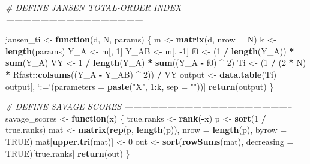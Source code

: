 \documentclass[11pt,]{article}
\newenvironment{Shaded}{\begin{snugshade}}{\end{snugshade}}
\newcommand{\CommentTok}[1]{\textcolor[rgb]{0.56,0.35,0.01}{\textit{#1}}}
\newcommand{\ControlFlowTok}[1]{\textcolor[rgb]{0.13,0.29,0.53}{\textbf{#1}}}
\newcommand{\DataTypeTok}[1]{\textcolor[rgb]{0.13,0.29,0.53}{#1}}
\newcommand{\DecValTok}[1]{\textcolor[rgb]{0.00,0.00,0.81}{#1}}
\newcommand{\KeywordTok}[1]{\textcolor[rgb]{0.13,0.29,0.53}{\textbf{#1}}}
\newcommand{\NormalTok}[1]{#1}
\newcommand{\OperatorTok}[1]{\textcolor[rgb]{0.81,0.36,0.00}{\textbf{#1}}}
\newcommand{\OtherTok}[1]{\textcolor[rgb]{0.56,0.35,0.01}{#1}}
\newcommand{\StringTok}[1]{\textcolor[rgb]{0.31,0.60,0.02}{#1}}
\begin{document}
\begin{Shaded}
\begin{Highlighting}[]
\CommentTok{# DEFINE JANSEN TOTAL-ORDER INDEX ------------------------------------------------}

\NormalTok{jansen_ti <-}\StringTok{ }\ControlFlowTok{function}\NormalTok{(d, N, params) \{}
\NormalTok{  m <-}\StringTok{ }\KeywordTok{matrix}\NormalTok{(d, }\DataTypeTok{nrow =}\NormalTok{ N)}
\NormalTok{  k <-}\StringTok{ }\KeywordTok{length}\NormalTok{(params)}
\NormalTok{  Y_A <-}\StringTok{ }\NormalTok{m[, }\DecValTok{1}\NormalTok{]}
\NormalTok{  Y_AB <-}\StringTok{ }\NormalTok{m[, }\DecValTok{-1}\NormalTok{]}
\NormalTok{  f0 <-}\StringTok{ }\NormalTok{(}\DecValTok{1} \OperatorTok{/}\StringTok{ }\KeywordTok{length}\NormalTok{(Y_A)) }\OperatorTok{*}\StringTok{ }\KeywordTok{sum}\NormalTok{(Y_A)}
\NormalTok{  VY <-}\StringTok{ }\DecValTok{1} \OperatorTok{/}\StringTok{ }\KeywordTok{length}\NormalTok{(Y_A) }\OperatorTok{*}\StringTok{ }\KeywordTok{sum}\NormalTok{((Y_A }\OperatorTok{-}\StringTok{ }\NormalTok{f0) }\OperatorTok{^}\StringTok{ }\DecValTok{2}\NormalTok{)}
\NormalTok{  Ti <-}\StringTok{ }\NormalTok{(}\DecValTok{1} \OperatorTok{/}\StringTok{ }\NormalTok{(}\DecValTok{2} \OperatorTok{*}\StringTok{ }\NormalTok{N) }\OperatorTok{*}\StringTok{ }\NormalTok{Rfast}\OperatorTok{::}\KeywordTok{colsums}\NormalTok{((Y_A }\OperatorTok{-}\StringTok{ }\NormalTok{Y_AB) }\OperatorTok{^}\StringTok{ }\DecValTok{2}\NormalTok{)) }\OperatorTok{/}\StringTok{ }\NormalTok{VY}
\NormalTok{  output <-}\StringTok{ }\KeywordTok{data.table}\NormalTok{(Ti)}
\NormalTok{  output[, }\StringTok{`}\DataTypeTok{:=}\StringTok{`}\NormalTok{(}\DataTypeTok{parameters =} \KeywordTok{paste}\NormalTok{(}\StringTok{"X"}\NormalTok{, }\DecValTok{1}\OperatorTok{:}\NormalTok{k, }\DataTypeTok{sep =} \StringTok{""}\NormalTok{))]}
  \KeywordTok{return}\NormalTok{(output)}
\NormalTok{\}}

\CommentTok{# DEFINE SAVAGE SCORES -----------------------------------------------------------}
\NormalTok{savage_scores <-}\StringTok{ }\ControlFlowTok{function}\NormalTok{(x) \{}
\NormalTok{  true.ranks <-}\StringTok{ }\KeywordTok{rank}\NormalTok{(}\OperatorTok{-}\NormalTok{x)}
\NormalTok{  p <-}\StringTok{ }\KeywordTok{sort}\NormalTok{(}\DecValTok{1} \OperatorTok{/}\StringTok{ }\NormalTok{true.ranks)}
\NormalTok{  mat <-}\StringTok{ }\KeywordTok{matrix}\NormalTok{(}\KeywordTok{rep}\NormalTok{(p, }\KeywordTok{length}\NormalTok{(p)), }\DataTypeTok{nrow =} \KeywordTok{length}\NormalTok{(p), }\DataTypeTok{byrow =} \OtherTok{TRUE}\NormalTok{)}
\NormalTok{  mat[}\KeywordTok{upper.tri}\NormalTok{(mat)] <-}\StringTok{ }\DecValTok{0}
\NormalTok{  out <-}\StringTok{ }\KeywordTok{sort}\NormalTok{(}\KeywordTok{rowSums}\NormalTok{(mat), }\DataTypeTok{decreasing =} \OtherTok{TRUE}\NormalTok{)[true.ranks]}
  \KeywordTok{return}\NormalTok{(out)}
\NormalTok{\}}


\end{Highlighting}
\end{Shaded}
\end{document}
